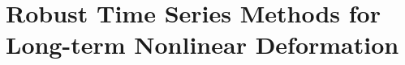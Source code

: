


\chapter{Robust Time Series Methods for Long-term Nonlinear Deformation}
\label{CHAP:5-robust-ts}




